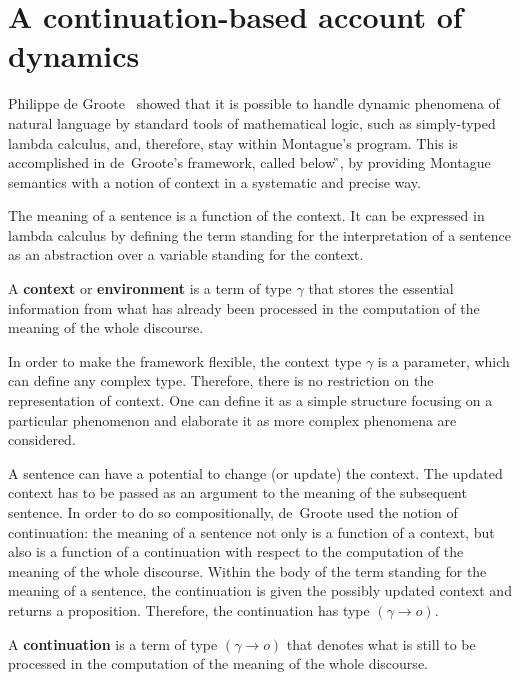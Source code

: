 \section{A continuation-based account of dynamics} \label{sec:cont_based_dyn}

Philippe de Groote~\cite{deGroote:2006:Towards-a-Montagovian-Account-of-Dynamics} showed that it is possible to handle dynamic phenomena of natural language by standard tools of mathematical logic, such as simply-typed lambda calculus, and, therefore, stay within Montague's program. This is accomplished in de~Groote's framework, called below {\G}, by providing Montague semantics with a notion of context in a systematic and precise way. 

The meaning of a sentence is a function of the context. It can be expressed in lambda calculus by defining the term standing for the interpretation of a sentence as an abstraction over a variable standing for the context. 

\begin{definition} A \textbf{context} or \textbf{environment} is a term of type $\gamma$ that stores the essential information from what has already been processed in the computation of the meaning of the whole discourse.
\end{definition}

In order to make the framework flexible, the context type $\gamma$ is a parameter, which can define any complex type. Therefore, there is no restriction on the representation of context. One can define it as a simple structure focusing on a particular phenomenon and elaborate it as more complex phenomena are considered.

A sentence can have a potential to change (or update) the context. The updated context has to be passed as an argument to the meaning of the subsequent sentence. In order to do so compositionally, de~Groote used the notion of continuation: the meaning of a sentence not only is a function of a context, but also is a function of a continuation with respect to the computation of the meaning of the whole discourse. Within the body of the term standing for the meaning of a sentence, the continuation is given the possibly updated context and returns a proposition. Therefore, the continuation has type $(\gamma \rightarrow o)$.
\begin{definition}[Continuation] A \textbf{continuation} is a term of type $(\gamma \rightarrow o)$ that denotes what is still to be processed in the computation of the meaning of the whole discourse. 
\end{definition}

